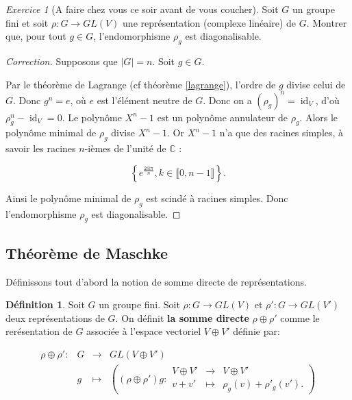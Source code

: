 \documentclass[french]{article}
\theoremstyle{theorem}
\theoremstyle{definition}
\newtheorem{protodefinition}{Définition}[section]
\newenvironment{definition}
    {\colorlet{shadecolor}{green!5}\begin{shaded}\begin{protodefinition}}
    {\end{protodefinition}\end{shaded}}
\theoremstyle{remark}
\newtheorem{exo}{Exercice}
\newcommand{\C}{\mathbb{C}}
\begin{document}
\begin{exo}[A faire chez vous ce soir avant de vous coucher]
  Soit \(G\) un groupe fini et soit \(\rho : G \longrightarrow GL(V)\) une représentation (complexe linéaire) de \(G\). Montrer que, pour tout \(g \in G\), l'endomorphisme \(\rho_g\) est diagonalisable.
\end{exo}

\begin{proof}[Correction]
  Supposons que \(\lvert G \rvert = n\). Soit \(g \in G\).

  Par le théorème de Lagrange (cf théorème \ref{lagrange}), l'ordre de \(g\) divise celui de \(G\). Donc \(g^{n} = e\), où \(e\) est l'élément neutre de \(G\). Donc on a \((\rho_g)^{n} = \operatorname{id}_V\), d'où \(\rho_g^{n}-\operatorname{id}_V = 0\). Le polynôme \(X^{n}-1 \) est un polynôme annulateur de \(\rho_g\). Alors le polynôme minimal de \(\rho_g\) divise \(X^{n}-1\). Or \(X ^{n}-1\) n'a que des racines simples, à savoir les racines \(n\)-ièmes de l'unité de \(\C\) :

  \[\left\{ e^{\frac{2 i k \pi}{n}}, k \in \llbracket 0, n-1 \rrbracket \right\}.\]  %

  Ainsi le polynôme minimal de \(\rho_g\) est scindé à racines simples. Donc l'endomorphisme \(\rho_g\) est diagonalisable.
\end{proof}

\subsection{Théorème de Maschke}

Définissons tout d'abord la notion de somme directe de représentations.

\begin{definition}
  Soit \(G\) un groupe fini. Soit \(\rho : G \to GL(V)\) et \(\rho' : G \to GL(V')\) deux représentations de \(G\). On définit \textbf{la somme directe} \(\rho\oplus \rho'\) comme le rerésentation de \(G\) associée à l'espace vectoriel \(V \oplus V'\) définie par:

  \begin{equation}
    \begin{matrix}
    \rho \oplus \rho' : & G & \longrightarrow & GL(V\oplus V') \\
    \ & g & \longmapsto & \left((\rho \oplus \rho')g : \begin{matrix}
      V \oplus V' & \longrightarrow & V \oplus V' \\
      v + v' & \longmapsto & \rho_g(v) + \rho'_g(v').
    \end{matrix}\right)
    \end{matrix}
  \end{equation}
\end{definition}
\end{document}
